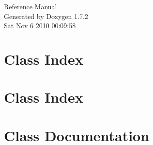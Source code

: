 \documentclass[a4paper]{book}
\begin{document}
\hypersetup{pageanchor=false}
\begin{titlepage}
\vspace*{7cm}
\begin{center}
{\Large Reference Manual}\\
\vspace*{1cm}
{\large Generated by Doxygen 1.7.2}\\
\vspace*{0.5cm}
{\small Sat Nov 6 2010 00:09:58}\\
\end{center}
\end{titlepage}
\clearemptydoublepage
{}
\tableofcontents
\clearemptydoublepage
{}
\hypersetup{pageanchor=true}
\chapter{Class Index}

\chapter{Class Index}

\chapter{Class Documentation}


































\printindex
\end{document}
